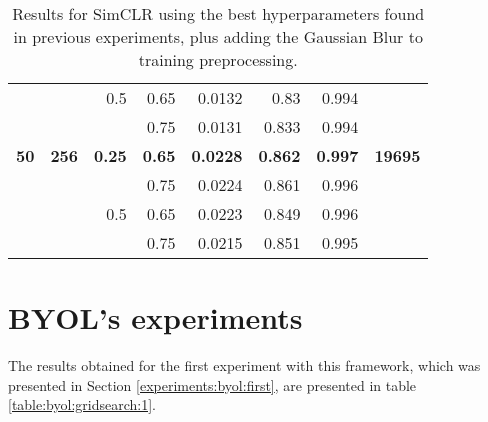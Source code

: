 \begin{table}[H]
{\begin{tabular}{rrrrrrrr}
                  &              & 0.5           & 0.65          & 0.0132               & 0.83                    & 0.994                   &                \\
                  &              &               & 0.75          & 0.0131               & 0.833                   & 0.994                   &                \\
    \textbf{50}   & \textbf{256} & \textbf{0.25} & \textbf{0.65} & \textbf{0.0228}      & \textbf{0.862}          & \textbf{0.997}          & \textbf{19695} \\
                  &              &               & 0.75          & 0.0224               & 0.861                   & 0.996                   &                \\
                  &              & 0.5           & 0.65          & 0.0223               & 0.849                   & 0.996                   &                \\
                  &              &               & 0.75          & 0.0215               & 0.851                   & 0.995                   &               
    \end{tabular}
    }
    \caption{Results for SimCLR using the best hyperparameters found in previous experiments, plus adding the Gaussian Blur to training preprocessing.}
    \label{table:simclr:gridsearch:blur}
    \end{table}

\section{BYOL's experiments}


The results obtained for the first experiment with this framework, which was presented in Section \ref{experiments:byol:first}, are presented in table \ref{table:byol:gridsearch:1}.

